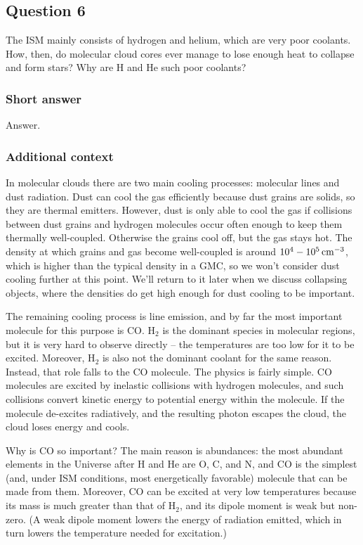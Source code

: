 \documentclass[a4paper,10pt]{article}
\begin{document}
\newpage
\subsection{Question 6}

The ISM mainly consists of hydrogen and helium, which are very poor coolants. How, then, do molecular cloud cores ever manage to lose enough heat to collapse and form stars? Why are H
and He such poor coolants?

\subsubsection{Short answer}

Answer.

\subsubsection{Additional context}

In molecular clouds there are two main cooling processes: molecular lines and dust radiation. Dust can cool the gas efficiently because dust grains are solids, so they are thermal emitters. However, dust is only able to cool the gas if collisions between dust grains and hydrogen molecules occur often enough to keep them thermally well-coupled. Otherwise the grains cool off, but the gas stays hot. The density at which grains and gas become well-coupled is around $10^4-10^5\,{\rm cm^{-3}}$, which is higher than the typical density in a GMC, so we won't consider dust cooling further at this point. We'll return to it later when we discuss collapsing objects, where the densities do get high enough for dust cooling to be important.

{\noindent}The remaining cooling process is line emission, and by far the most important molecule for this purpose is CO. H$_2$ is the dominant species in molecular regions, but it is very hard to observe directly -- the temperatures are too low for it to be excited. Moreover, H$_2$ is also not the dominant coolant for the same reason. Instead, that role falls to the CO molecule. The physics is fairly simple. CO molecules are excited by inelastic collisions with hydrogen molecules, and such collisions convert kinetic energy to potential energy within the molecule. If the molecule de-excites radiatively, and the resulting photon escapes the cloud, the cloud loses energy and cools.

{\noindent}Why is CO so important? The main reason is abundances: the most abundant elements in the Universe after H and He are O, C, and N, and CO is the simplest (and, under ISM conditions, most energetically favorable) molecule that can be made from them. Moreover, CO can be excited at very low temperatures because its mass
is much greater than that of H$_2$, and its dipole moment is weak but non-zero. (A weak dipole moment lowers the energy of radiation emitted, which in turn lowers the temperature needed for excitation.)
\end{document}
